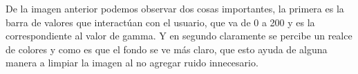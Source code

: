 De la imagen anterior podemos observar dos cosas importantes, la primera es la barra de valores
que interactúan con el usuario, que va de 0 a 200 y es la correspondiente al valor de gamma. Y en
segundo claramente se percibe un realce de colores y como es que el fondo se ve más claro, que esto
ayuda de alguna manera a limpiar la imagen al no agregar ruido innecesario.


